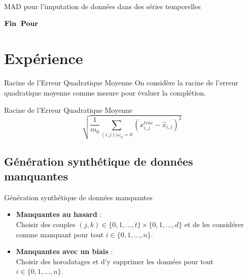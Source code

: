 \documentclass{beamer}
\begin{document}
\begin{frame}{MAD pour l'imputation de données dans des séries temporelles}
\begin{center}
{\begin{minipage}{1\linewidth}
\begin{algorithm}[H]
                    \tabto{0.2cm}$\textbf{Fin\: Pour}$
                    
                    
                    
                    \caption{{Imputation avec MAD et Sinkhorn par lots} \label{Algorithm3}}
                    
                \end{algorithm}
            \end{minipage}%
        }
    \end{center}
\end{frame}

\section{Expérience}

\begin{frame}{Racine de l'Erreur Quadratique Moyenne}
    On considère la racine de l'erreur quadratique moyenne comme mesure pour évaluer la complétion.
    \begin{block} {Racine de l'Erreur Quadratique Moyenne}
        $$\sqrt{\frac{1}{m_0} \sum_{(i,j)|\omega_{ij} = 0} (x^{true}_{i,j} - \hat{x}_{i,j})^2 }$$
    \end{block}
\end{frame}


\subsection{Génération synthétique de données manquantes}

\begin{frame}{Génération synthétique de données manquantes}
    \begin{itemize}
        \item \textbf{Manquantes au hasard} :\\
            Choisir des couples $(j,k) \in \{0, 1, ..., t\}\times \{0, 1, ..., d\}$ et de les considérer comme manquant pour tout $i \in \{0, 1, ..., n\}$.

        \item \textbf{Manquantes avec un biais} :\\
            Choisir des horodatages et d'y supprimer les données pour tout $i \in \{0, 1, ..., n\}$.
    \end{itemize}
    
\end{frame}
\end{document}
